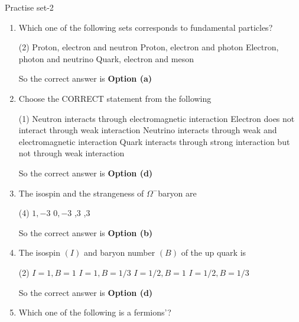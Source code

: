 \begin{abox}
	Practise set-2
\end{abox}
\begin{enumerate}
	\item  Which one of the following sets corresponds to fundamental particles?
	{}
	\begin{tasks}(2)
		\task[\textbf{a.}]Proton, electron and neutron
		\task[\textbf{b.}]Proton, electron and photon
		\task[\textbf{c.}]Electron, photon and neutrino
		\task[\textbf{d.}]Quark, electron and meson 
	\end{tasks}
	\begin{answer}
		So the correct answer is \textbf{Option (a)}
	\end{answer}
	\item  Choose the CORRECT statement from the following
	\begin{tasks}(1)
		\task[\textbf{a.}]Neutron interacts through electromagnetic interaction
		\task[\textbf{b.}]Electron does not interact through weak interaction
		\task[\textbf{c.}]Neutrino interacts through weak and electromagnetic interaction
		\task[\textbf{d.}] Quark interacts through strong interaction but not through weak interaction
	\end{tasks}
	\begin{answer}
		So the correct answer is \textbf{Option (d)}
	\end{answer}
	\item  The isospin and the strangeness of $\Omega^{-}$baryon are
	{}
	\begin{tasks}(4)
		\task[\textbf{a.}]$1,-3$
		\task[\textbf{b.}]$0,-3$
		,3
		,3 
	\end{tasks}
	\begin{answer}
		So the correct answer is \textbf{Option (b)}
	\end{answer}
	\item The isospin $(I)$ and baryon number $(B)$ of the up quark is
	{}
	\begin{tasks}(2)
		\task[\textbf{a.}]$I=1, B=1$
		\task[\textbf{b.}]$I=1, B=1 / 3$
		\task[\textbf{c.}]$I=1 / 2, B=1$
		\task[\textbf{d.}]$I=1 / 2, B=1 / 3$ 
	\end{tasks}
	\begin{answer}
		So the correct answer is \textbf{Option (d)}
	\end{answer}
	\item  Which one of the following is a fermions'?

\end{enumerate}
